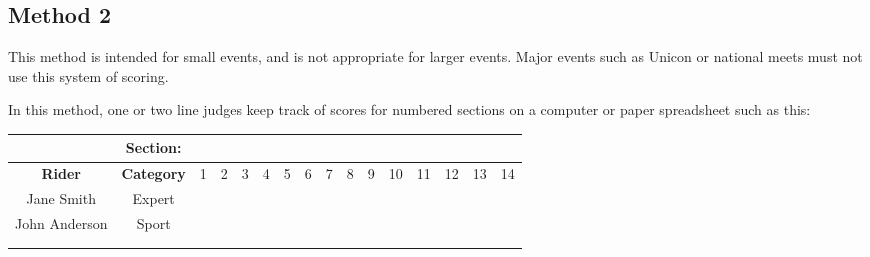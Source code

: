 \subsection{Method 2}
This method is intended for small events, and is not appropriate for larger events.
Major events such as Unicon or national meets must not use this system of scoring.

In this method, one or two line judges keep track of scores for numbered sections on a computer or paper spreadsheet such as this:

\begin{tabular}{|c|c|c|c|c|c|c|c|c|c|c|c|c|c|c|c|}
\hline
 & \textbf{Section:} & & &  & &  &  &  &  &  & & & &  &   \\
\hline
\textbf{Rider} & \textbf{Category} & 1 & 2 & 3 & 4 & 5 & 6 & 7 & 8 & 9 & 10 & 11 & 12 & 13 & 14 \\
\hline
Jane Smith & Expert &  &  &  &  &  &  &  &  &  &  &  &  &  & \\
\hline
John Anderson & Sport &  &  &  &  &  &  &  & &  &  &  &  &  &  \\
\hline
 &  &  &  &  &  &  &  &  &  &  &  &  &  &  & \\
\hline
 &  &  &  &  &  &  &  &  &  &  &  &  &  &  & \\
\hline
\end{tabular}
